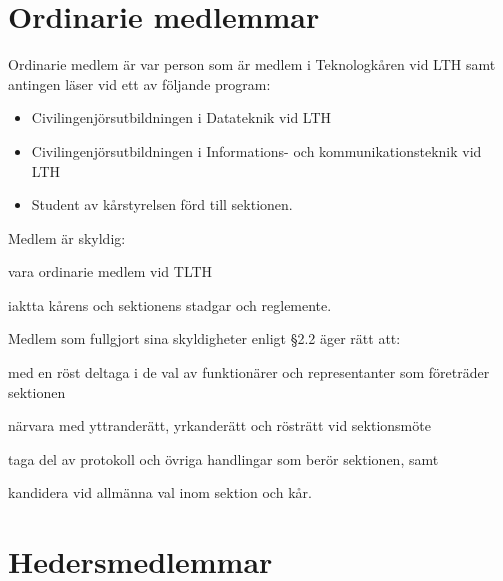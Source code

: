 \documentclass[stadgar]{dsekprotokoll}
\begin{document}
\section{Ordinarie medlemmar}

\begin{stadgeavsnitt}


 Ordinarie medlem är var person som är medlem i Teknologkåren vid LTH samt antingen läser vid
ett av följande program:
\begin{itemize}
\item Civilingenjörsutbildningen i Datateknik vid LTH
\item Civilingenjörsutbildningen i Informations- och kommunikationsteknik vid LTH
\item Student av kårstyrelsen förd till sektionen.
\end{itemize}


Medlem är skyldig:
\begin{attlista}
\item vara ordinarie medlem vid TLTH
\item iaktta kårens och sektionens stadgar och reglemente.
\end{attlista}


Medlem som fullgjort sina skyldigheter enligt \S2.2 äger rätt att:
\begin{attlista}
\item med en röst deltaga i de val av funktionärer och representanter som
  företräder sektionen
\item närvara med yttranderätt, yrkanderätt och rösträtt vid sektionsmöte
\item taga del av protokoll och övriga handlingar som berör sektionen, samt
\item kandidera vid allmänna val inom sektion och kår.
\end{attlista}

\end{stadgeavsnitt}

\section{Hedersmedlemmar}
\end{document}
